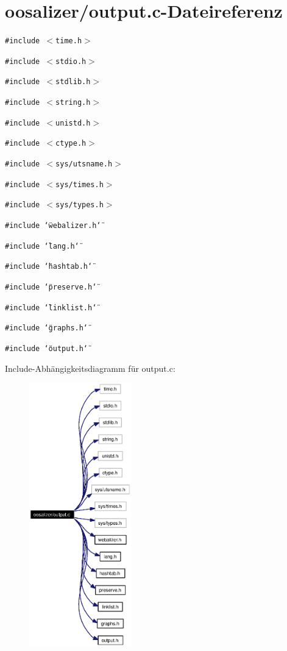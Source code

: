 \section{oosalizer/output.c-Dateireferenz}
\label{output_8c}
{\tt \#include $<$time.h$>$}\par
{\tt \#include $<$stdio.h$>$}\par
{\tt \#include $<$stdlib.h$>$}\par
{\tt \#include $<$string.h$>$}\par
{\tt \#include $<$unistd.h$>$}\par
{\tt \#include $<$ctype.h$>$}\par
{\tt \#include $<$sys/utsname.h$>$}\par
{\tt \#include $<$sys/times.h$>$}\par
{\tt \#include $<$sys/types.h$>$}\par
{\tt \#include \char`\"{}webalizer.h\char`\"{}}\par
{\tt \#include \char`\"{}lang.h\char`\"{}}\par
{\tt \#include \char`\"{}hashtab.h\char`\"{}}\par
{\tt \#include \char`\"{}preserve.h\char`\"{}}\par
{\tt \#include \char`\"{}linklist.h\char`\"{}}\par
{\tt \#include \char`\"{}graphs.h\char`\"{}}\par
{\tt \#include \char`\"{}output.h\char`\"{}}\par


Include-Abh\"{a}ngigkeitsdiagramm f\"{u}r output.c:\begin{figure}[H]
\begin{center}
\leavevmode
\includegraphics[width=125pt]{output_8c__incl}
\end{center}
\end{figure}
